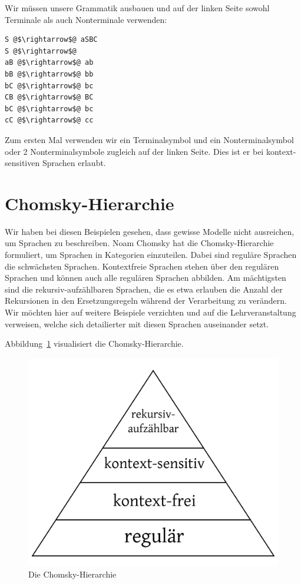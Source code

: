Wir müssen unsere Grammatik ausbauen und auf der linken Seite sowohl Terminale als auch Nonterminale verwenden:
\begin{lstlisting}
S @$\rightarrow$@ aSBC
S @$\rightarrow$@
aB @$\rightarrow$@ ab
bB @$\rightarrow$@ bb
bC @$\rightarrow$@ bc
CB @$\rightarrow$@ BC
bC @$\rightarrow$@ bc
cC @$\rightarrow$@ cc
\end{lstlisting}

Zum ersten Mal verwenden wir ein Terminalsymbol und ein Nonterminalsymbol oder 2 Nonterminalsymbole zugleich auf der linken Seite. Dies ist er bei kontext-sensitiven Sprachen erlaubt.

\section{Chomsky-Hierarchie}
%
Wir haben bei diesen Beispielen gesehen, dass gewisse Modelle nicht ausreichen, um Sprachen zu beschreiben. Noam Chomsky hat die Chomsky-Hierarchie formuliert, um Sprachen in Kategorien einzuteilen. Dabei sind reguläre Sprachen die schwächsten Sprachen. Kontextfreie Sprachen stehen über den regulären Sprachen und können auch alle regulären Sprachen abbilden. Am mächtigsten sind die rekursiv-aufzählbaren Sprachen, die es etwa erlauben die Anzahl der Rekursionen in den Ersetzungsregeln während der Verarbeitung zu verändern. Wir möchten hier auf weitere Beispiele verzichten und auf die Lehrveranstaltung \courseswp{} verweisen, welche sich detailierter mit diesen Sprachen auseinander setzt.

Abbildung~\ref{fig:chomsky_hierarchy} visualisiert die Chomsky-Hierarchie.
%
\begin{figure}[h]
 \begin{center}
  \includegraphics{img/chomsky_hierarchy.pdf}
  \caption{Die Chomsky-Hierarchie}
  \label{fig:chomsky_hierarchy}
 \end{center}
\end{figure}
